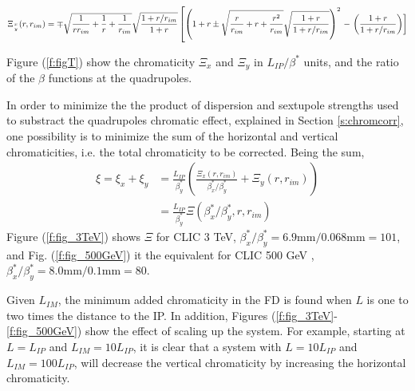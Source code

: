 {\scriptsize
\begin{equation}
 \Xi_{x\atop y}(r,r_{im})=\mp\sqrt{\frac{1}{rr_{im}}+\frac{1}{r}+\frac{1}{r_{im}}}\sqrt{\frac{1+r/r_{im}}{1+r}} \left[\left(1+r\pm\sqrt{\frac{r}{r_{im}}+r+\frac{r^2}{r_{im}}}\sqrt{\frac{1+r}{1+r/r_{im}}}\right)^2\right.-\left.\left(\frac{1+r}{1+r/r_{im}}\right)\right]
\end{equation}}\par
Figure (\ref{f:figT}) show the chromaticity $\Xi_x$ and $\Xi_y$ in $L_{IP}/\beta^*$ units, and the ratio of the $\beta$ functions at the quadrupoles.\par
In order to minimize the the product of dispersion and sextupole strengths used to substract the quadrupoles chromatic effect, explained in Section \ref{s:chromcorr}, one possibility is to minimize the sum of the horizontal and vertical chromaticities, i.e. the total chromaticity to be corrected. Being the sum, 
\begin{align}
 \xi = \xi_x + \xi_y &= \frac{L_{IP}}{\beta^*_y}\left(\frac{\Xi_x(r,r_{im})}{\beta^*_x/\beta^*_y}+\Xi_y(r,r_{im})\right)\\
 &= \frac{L_{IP}}{\beta^*_y}\Xi(\beta^*_x/\beta^*_y,r,r_{im})
\end{align}
Figure (\ref{f:fig_3TeV}) shows $\Xi$ for CLIC 3 TeV, $\beta^*_x/\beta^*_y=6.9\text{mm}/0.068\text{mm}=101$, and Fig. (\ref{f:fig_500GeV}) it the equivalent for CLIC 500 GeV \cite{CLICdes}, $\beta^*_x/\beta^*_y=8.0\text{mm}/0.1\text{mm}=80$.\par
Given $L_{IM}$, the minimum added chromaticity in the FD is found when $L$ is one to two times the distance to the IP. In addition, Figures (\ref{f:fig_3TeV}-\ref{f:fig_500GeV}) show the effect of scaling up the system. For example, starting at $L=L_{IP}$ and $L_{IM}=10L_{IP}$, it is clear that a system with $L=10L_{IP}$ and $L_{IM}=100L_{IP}$, will decrease the vertical chromaticity by increasing the horizontal chromaticity.
